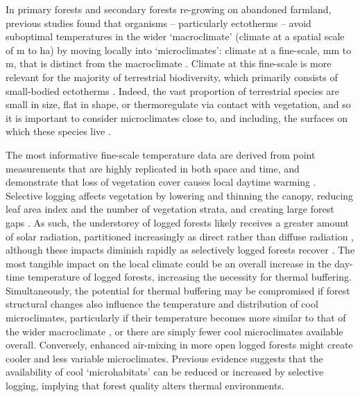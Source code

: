 \documentclass[12pt,a4paper,]{report}
\theoremstyle{definition}
\theoremstyle{definition}
\theoremstyle{definition}
\theoremstyle{remark}
\begin{document}
In primary forests and secondary forests re-growing on abandoned
farmland, previous studies found that organisms -- particularly
ectotherms -- avoid suboptimal temperatures in the wider `macroclimate'
(climate at a spatial scale of m to ha) by moving locally into
`microclimates': climate at a fine-scale, mm to m, that is distinct from
the macroclimate
\citep{scheffers_microhabitats2014-1, scheffers_microhabitats2014, gonzalez_del_pliego_thermally2016}.
Climate at this fine-scale is more relevant for the majority of
terrestrial biodiversity, which primarily consists of small-bodied
ectotherms
\citep{suggitt_habitat2011, potter_microclimatic2013, nadeau_coarse2017}.
Indeed, the vast proportion of terrestrial species are small in size,
flat in shape, or thermoregulate via contact with vegetation, and so it
is important to consider microclimates close to, and including, the
surfaces on which these species live
\citep{kaspari_thermal2015, scheffers_extreme2017}.

The most informative fine-scale temperature data are derived from point
measurements that are highly replicated in both space and time, and
demonstrate that loss of vegetation cover causes local daytime warming
\citep{senior_pantropical2017, ewers_fragmentation2013, hardwick_relationship2015, gonzalez_del_pliego_thermally2016}.
Selective logging affects vegetation by lowering and thinning the
canopy, reducing leaf area index
\citep{hardwick_relationship2015, ewers_logging2015} and the number of
vegetation strata, and creating large forest gaps
\citep{okuda_effect2003, kumar_effects2005}. As such, the understorey of
logged forests likely receives a greater amount of solar radiation,
partitioned increasingly as direct rather than diffuse radiation
\citep{oke_boundary1987}, although these impacts diminish rapidly as
selectively logged forests recover \citep{asner_canopy2004}. The most
tangible impact on the local climate could be an overall increase in the
day-time temperature of logged forests, increasing the necessity for
thermal buffering. Simultaneously, the potential for thermal buffering
may be compromised if forest structural changes also influence the
temperature and distribution of cool microclimates, particularly if
their temperature becomes more similar to that of the wider macroclimate
\citep[e.g.][]{caillon_warming2014}, or there are simply fewer cool
microclimates available overall. Conversely, enhanced air-mixing in more
open logged forests might create cooler and less variable microclimates.
Previous evidence suggests that the availability of cool `microhabitats'
\citep[localised environments within which cool microclimates are
contained;][]{scheffers_microhabitats2014-1, gonzalez_del_pliego_thermally2016, shi_framework2016}
can be reduced \citep[e.g., leaf litter;][]{saner_reduced2009} or
increased \citep[e.g., deadwood;][]{carlson_deadwood2017} by selective
logging, implying that forest quality alters thermal environments.
\end{document}
